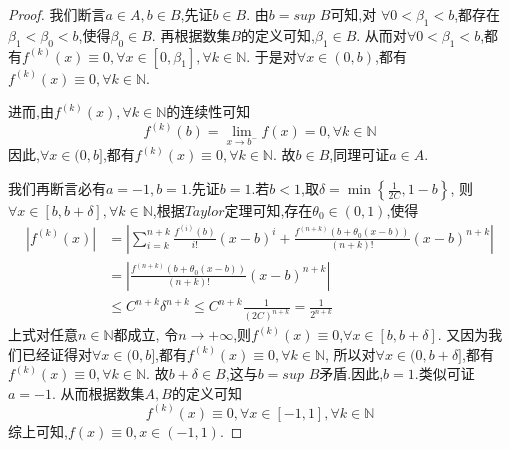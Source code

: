 \documentclass[lang=cn,newtx,10pt,scheme=chinese]{elegantbook}
\begin{document}
\begin{exercise}
\begin{proof}
        我们断言$a\in A,b\in B$,先证$b\in B$.
        由$b=sup\,\,B$可知,对
        $\forall 0<\beta_1<b$,都存在$\beta_1<\beta_0<b$,使得$\beta_0\in B$.
        再根据数集$B$的定义可知,$\beta_1\in B$.
        从而对$\forall 0<\beta_1<b$,都有$f^{\left( k \right)}\left( x \right) \equiv 0,\forall x\in \left[ 0,\beta_1 \right] ,\forall k\in \mathbb{N}$.
        于是对$\forall x\in(0,b)$,都有$f^{(k)}(x)\equiv0,\forall k\in \mathbb{N}$.

        进而,由$f^{(k)}(x),\forall k\in \mathbb{N}$的连续性可知
        \begin{equation}
            f^{\left( k \right)}\left( b \right) =\underset{x\rightarrow b^-}{\lim}f\left( x \right) =0,\forall k\in \mathbb{N}
            \nonumber
        \end{equation}
        因此,$\forall x\in(0,b]$,都有$f^{(k)}(x)\equiv0,\forall k\in\mathbb{N}$.
        故$b\in B$,同理可证$a\in A$.

        我们再断言必有$a=-1,b=1$.先证$b=1$.若$b<1$,取$\delta=\min \left\{ \frac{1}{2C},1-b \right\}$,
        则$\forall x\in[b,b+\delta],\forall k\in\mathbb{N}$,根据$Taylor$定理可知,存在$\theta_0\in(0,1)$,使得
        \begin{equation}
            \begin{split}
                \left| f^{\left( k \right)}\left( x \right) \right|&=\left| \sum_{i=k}^{n+k}{\frac{f^{\left( i \right)}\left( b \right)}{i!}\left( x-b \right) ^i}+\frac{f^{\left( n+k \right)}\left( b+\theta _0\left( x-b \right) \right)}{\left( n+k \right) !}\left( x-b \right) ^{n+k} \right|
\\
&=\left| \frac{f^{\left( n+k \right)}\left( b+\theta _0\left( x-b \right) \right)}{\left( n+k \right) !}\left( x-b \right) ^{n+k} \right|
\\
&\leqslant C^{n+k}\delta ^{n+k}\leqslant C^{n+k}\frac{1}{\left( 2C \right) ^{n+k}}=\frac{1}{2^{n+k}}
            \end{split}
            \nonumber
        \end{equation}
        上式对任意$n\in\mathbb{N}$都成立,
        令$n \to +\infty$,则$f^{(k)}(x)\equiv0$,$\forall x\in[b,b+\delta]$.
        又因为我们已经证得对$\forall x\in(0,b]$,都有$f^{(k)}(x)\equiv0,\forall k\in\mathbb{N}$,
        所以对$\forall x\in(0,b+\delta]$,都有$f^{(k)}(x)\equiv0,\forall k\in\mathbb{N}$.
        故$b+\delta \in B$,这与$b=sup\,\,B$矛盾.因此,$b=1$.类似可证$a=-1$.
        从而根据数集$A,B$的定义可知
        \begin{equation}
            f^{\left( k \right)}\left( x \right) \equiv 0,\forall x\in \left[ -1,1 \right] ,\forall k\in \mathbb{N} 
            \nonumber
        \end{equation}
        综上可知,$f(x)\equiv0,x\in(-1,1)$.
    \end{proof}
\end{exercise}
\end{document}
